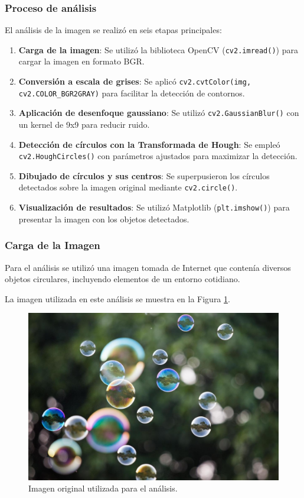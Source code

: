 \documentclass[conference]{IEEEtran}
\begin{document}
\subsubsection{Proceso de análisis}

El análisis de la imagen se realizó en seis etapas principales:

\begin{enumerate}
    \item \textbf{Carga de la imagen}: Se utilizó la biblioteca OpenCV (\texttt{cv2.imread()}) para cargar la imagen en formato BGR.
    \item \textbf{Conversión a escala de grises}: Se aplicó \texttt{cv2.cvtColor(img, cv2.COLOR\_BGR2GRAY)} para facilitar la detección de contornos.
    \item \textbf{Aplicación de desenfoque gaussiano}: Se utilizó \texttt{cv2.GaussianBlur()} con un kernel de 9x9 para reducir ruido.
    \item \textbf{Detección de círculos con la Transformada de Hough}: Se empleó \texttt{cv2.HoughCircles()} con parámetros ajustados para maximizar la detección.
    \item \textbf{Dibujado de círculos y sus centros}: Se superpusieron los círculos detectados sobre la imagen original mediante \texttt{cv2.circle()}.
    \item \textbf{Visualización de resultados}: Se utilizó Matplotlib (\texttt{plt.imshow()}) para presentar la imagen con los objetos detectados.
\end{enumerate}


\subsubsection{Carga de la Imagen}

Para el análisis se utilizó una imagen tomada de Internet que contenía diversos objetos circulares, incluyendo elementos de un entorno cotidiano.

La imagen utilizada en este análisis se muestra en la Figura \ref{fig:original}.


\FloatBarrier

\begin{figure}[h]
    \centering
    \includegraphics[width=.45\textwidth]{imagen_original.jpg}
    \caption{Imagen original utilizada para el análisis.}
    \label{fig:original}
\end{figure}
\end{document}
